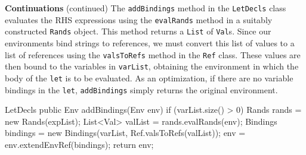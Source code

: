 \begin{minipage}[t]{\sw}
\slidenumber
\LARGE
{\bf Continuations} (continued)\exx
The \verb'addBindings' method in the \verb'LetDecls' class
evaluates the RHS expressions using the \verb'evalRands' method
in a suitably constructed \verb'Rands' object.
This method returns a \verb'List' of \verb'Val's.
Since our environments bind strings to references,
we must convert this list of values to a list of references
using the \verb'valsToRefs' method in the \verb'Ref' class.
These values are then bound to the variables in \verb'varList',
obtaining the environment
in which the body of the \verb'let' is to be evaluated.
As an optimization, if there are no variable bindings in the \verb'let',
\verb'addBindings' simply returns the original environment.
\Large
\begin{qv}
LetDecls
    public Env addBindings(Env env) {
        if (varList.size() > 0) {
            Rands rands = new Rands(expList);
            List<Val> valList = rands.evalRands(env);
            Bindings bindings =
                new Bindings(varList, Ref.valsToRefs(valList));
            env = env.extendEnvRef(bindings);
        }
        return env;
    }
\end{qv}
\end{minipage}
